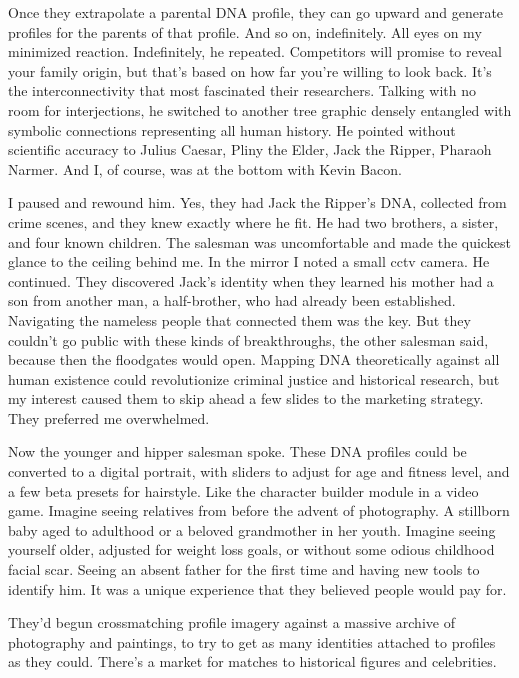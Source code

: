 Once they extrapolate a parental DNA profile, they can go upward and
generate profiles for the parents of that profile. And so on,
indefinitely. All eyes on my minimized reaction. Indefinitely, he
repeated. Competitors will promise to reveal your family origin, but
that's based on how far you're willing to look back. It's the
interconnectivity that most fascinated their researchers. Talking with
no room for interjections, he switched to another tree graphic densely
entangled with symbolic connections representing all human history. He
pointed without scientific accuracy to Julius Caesar, Pliny the Elder,
Jack the Ripper, Pharaoh Narmer. And I, of course, was at the bottom
with Kevin Bacon.

I paused and rewound him. Yes, they had Jack the Ripper's DNA, collected
from crime scenes, and they knew exactly where he fit. He had two
brothers, a sister, and four known children. The salesman was
uncomfortable and made the quickest glance to the ceiling behind me. In
the mirror I noted a small cctv camera. He continued. They discovered
Jack's identity when they learned his mother had a son from another man,
a half-brother, who had already been established. Navigating the
nameless people that connected them was the key. But they couldn't go
public with these kinds of breakthroughs, the other salesman said,
because then the floodgates would open. Mapping DNA theoretically
against all human existence could revolutionize criminal justice and
historical research, but my interest caused them to skip ahead a few
slides to the marketing strategy. They preferred me overwhelmed.

Now the younger and hipper salesman spoke. These DNA profiles could be
converted to a digital portrait, with sliders to adjust for age and
fitness level, and a few beta presets for hairstyle. Like the character
builder module in a video game. Imagine seeing relatives from before the
advent of photography. A stillborn baby aged to adulthood or a beloved
grandmother in her youth. Imagine seeing yourself older, adjusted for
weight loss goals, or without some odious childhood facial scar. Seeing
an absent father for the first time and having new tools to identify
him. It was a unique experience that they believed people would pay for.

They'd begun crossmatching profile imagery against a massive archive of
photography and paintings, to try to get as many identities attached to
profiles as they could. There's a market for matches to historical
figures and celebrities.

